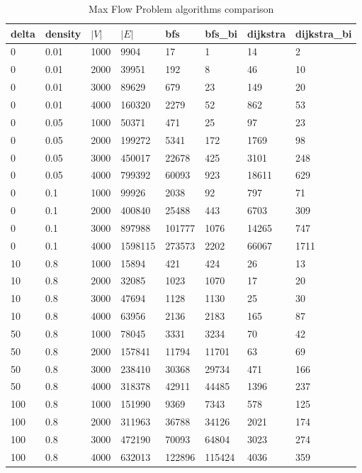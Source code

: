 \begin{table}[]
\begin{tabular}{llllllll}
delta & density & $|V|$  & $|E|$ & bfs    & bfs\_bi & dijkstra & dijkstra\_bi \\ \hline
0     & 0.01    & 1000 & 9904    & 17     & 1       & 14       & 2            \\
0     & 0.01    & 2000 & 39951   & 192    & 8       & 46       & 10           \\
0     & 0.01    & 3000 & 89629   & 679    & 23      & 149      & 20           \\
0     & 0.01    & 4000 & 160320  & 2279   & 52      & 862      & 53           \\
0     & 0.05    & 1000 & 50371   & 471    & 25      & 97       & 23           \\
0     & 0.05    & 2000 & 199272  & 5341   & 172     & 1769     & 98           \\
0     & 0.05    & 3000 & 450017  & 22678  & 425     & 3101     & 248          \\
0     & 0.05    & 4000 & 799392  & 60093  & 923     & 18611    & 629          \\
0     & 0.1     & 1000 & 99926   & 2038   & 92      & 797      & 71           \\
0     & 0.1     & 2000 & 400840  & 25488  & 443     & 6703     & 309          \\
0     & 0.1     & 3000 & 897988  & 101777 & 1076    & 14265    & 747          \\
0     & 0.1     & 4000 & 1598115 & 273573 & 2202    & 66067    & 1711         \\
10    & 0.8     & 1000 & 15894   & 421    & 424     & 26       & 13           \\
10    & 0.8     & 2000 & 32085   & 1023   & 1070    & 17       & 20           \\
10    & 0.8     & 3000 & 47694   & 1128   & 1130    & 25       & 30           \\
10    & 0.8     & 4000 & 63956   & 2136   & 2183    & 165      & 87           \\
50    & 0.8     & 1000 & 78045   & 3331   & 3234    & 70       & 42           \\
50    & 0.8     & 2000 & 157841  & 11794  & 11701   & 63       & 69           \\
50    & 0.8     & 3000 & 238410  & 30368  & 29734   & 471      & 166          \\
50    & 0.8     & 4000 & 318378  & 42911  & 44485   & 1396     & 237          \\
100   & 0.8     & 1000 & 151990  & 9369   & 7343    & 578      & 125          \\
100   & 0.8     & 2000 & 311963  & 36788  & 34126   & 2021     & 174          \\
100   & 0.8     & 3000 & 472190  & 70093  & 64804   & 3023     & 274          \\
100   & 0.8     & 4000 & 632013  & 122896 & 115424  & 4036     & 359
\end{tabular}
\caption{Max Flow Problem algorithms comparison}\label{table:mf}
\end{table}

